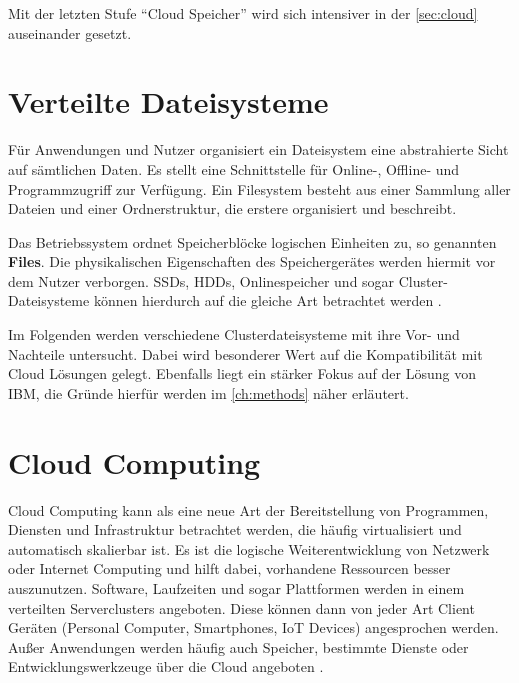 Mit der letzten Stufe ``Cloud Speicher'' wird sich intensiver in der \autoref{sec:cloud} auseinander gesetzt.



\newpage

\section{Verteilte Dateisysteme} \label{sec:filesystems}

Für Anwendungen und Nutzer organisiert ein Dateisystem eine abstrahierte Sicht auf sämtlichen Daten. Es stellt eine Schnittstelle für Online-, Offline- und Programmzugriff zur Verfügung. Ein Filesystem besteht aus einer Sammlung aller Dateien und einer Ordnerstruktur, die erstere organisiert und beschreibt. 

Das Betriebssystem ordnet Speicherblöcke logischen Einheiten zu, so genannten \textbf{Files}. Die physikalischen Eigenschaften des Speichergerätes werden hiermit vor dem Nutzer verborgen. SSDs, HDDs, Onlinespeicher und sogar Cluster-Dateisysteme können hierdurch auf die gleiche Art betrachtet werden \parencite{silberschatz.2012}.

Im Folgenden werden verschiedene Clusterdateisysteme mit ihre Vor- und Nachteile untersucht. Dabei wird besonderer Wert auf die Kompatibilität mit Cloud Lösungen gelegt. Ebenfalls liegt ein stärker Fokus auf der Lösung von IBM, die Gründe hierfür werden im \autoref{ch:methods} näher erläutert.



\section{Cloud Computing}\label{sec:cloud}

Cloud Computing kann als eine neue Art der Bereitstellung von Programmen, Diensten und Infrastruktur betrachtet werden, die häufig virtualisiert und automatisch skalierbar ist. Es ist die logische Weiterentwicklung von Netzwerk oder Internet Computing und hilft dabei, vorhandene Ressourcen besser auszunutzen. 
Software, Laufzeiten und sogar Plattformen werden in einem verteilten Serverclusters angeboten. Diese können dann von jeder Art  Client Geräten (Personal Computer, Smartphones, \ac{IoT} Devices) angesprochen werden. Außer Anwendungen werden häufig  auch Speicher, bestimmte Dienste oder Entwicklungswerkzeuge über die Cloud angeboten \parencite[S. 3]{furth.2010}.

